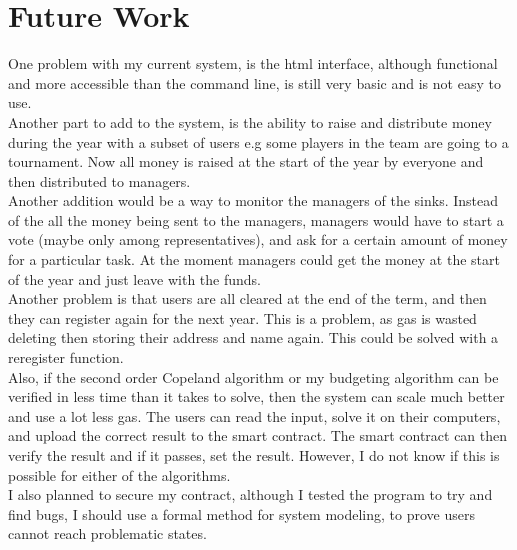 \chapter{Future Work} \label{Chapter: Future Work}
One problem with my current system, is the html interface, although functional and more accessible than the command line, is still very basic and is not easy to use. \\
Another part to add to the system, is the ability to raise and distribute money during the year with a subset of users e.g some players in the team are going to a tournament. Now all money is raised at the start of the year by everyone and then distributed to managers. \\
Another addition would be a way to monitor the managers of the sinks. Instead of the all the money being sent to the managers, managers would have to start a vote (maybe only among representatives), and ask for a certain amount of money for a particular task. At the moment managers could get the money at the start of the year and just leave with the funds. \\
Another problem is that users are all cleared at the end of the term, and then they can register again for the next year. This is a problem, as gas is wasted deleting then storing their address and name again. This could be solved with a reregister function. \\
Also, if the second order Copeland algorithm or my budgeting algorithm can be verified in less time than it takes to solve, then the system can scale much better and use a lot less gas. The users can read the input, solve it on their computers, and upload the correct result to the smart contract. The smart contract can then verify the result and if it passes, set the result. However, I do not know if this is possible for either of the algorithms. \\
I also planned to secure my contract, although I tested the program to try and find bugs, I should use a formal method for system modeling, to prove users cannot reach problematic states. 	





